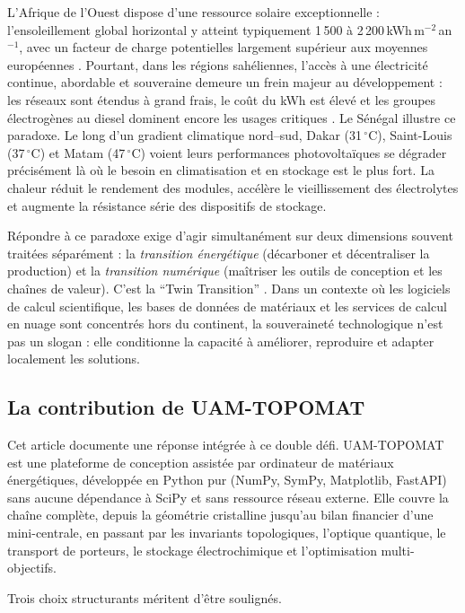 \documentclass[11pt,a4paper,french]{article}
\newcommand{\TOPOMAT}{UAM-TOPOMAT}
\begin{document}
L'Afrique de l'Ouest dispose d'une ressource solaire exceptionnelle : l'ensoleillement global horizontal y atteint typiquement 1\,500 à 2\,200\,kWh\,m$^{-2}$\,an$^{-1}$, avec un facteur de charge potentielles largement supérieur aux moyennes européennes \cite{aie2022,pse2014}. Pourtant, dans les régions sahéliennes, l'accès à une électricité continue, abordable et souveraine demeure un frein majeur au développement : les réseaux sont étendus à grand frais, le coût du kWh est élevé et les groupes électrogènes au diesel dominent encore les usages critiques \cite{banque2022}. Le Sénégal illustre ce paradoxe. Le long d'un gradient climatique nord--sud, Dakar (31\,$^\circ$C), Saint-Louis (37\,$^\circ$C) et Matam (47\,$^\circ$C) voient leurs performances photovoltaïques se dégrader précisément là où le besoin en climatisation et en stockage est le plus fort. La chaleur réduit le rendement des modules, accélère le vieillissement des électrolytes et augmente la résistance série des dispositifs de stockage.

Répondre à ce paradoxe exige d'agir simultanément sur deux dimensions souvent traitées séparément : la \emph{transition énergétique} (décarboner et décentraliser la production) et la \emph{transition numérique} (maîtriser les outils de conception et les chaînes de valeur). C'est la ``Twin Transition'' \cite{ce2020}. Dans un contexte où les logiciels de calcul scientifique, les bases de données de matériaux et les services de calcul en nuage sont concentrés hors du continent, la souveraineté technologique n'est pas un slogan : elle conditionne la capacité à améliorer, reproduire et adapter localement les solutions.

\subsection{La contribution de \TOPOMAT{}}

Cet article documente une réponse intégrée à ce double défi. \TOPOMAT{} est une plateforme de conception assistée par ordinateur de matériaux énergétiques, développée en Python pur (NumPy, SymPy, Matplotlib, FastAPI) sans aucune dépendance à SciPy et sans ressource réseau externe. Elle couvre la chaîne complète, depuis la géométrie cristalline jusqu'au bilan financier d'une mini-centrale, en passant par les invariants topologiques, l'optique quantique, le transport de porteurs, le stockage électrochimique et l'optimisation multi-objectifs.

Trois choix structurants méritent d'être soulignés.
\end{document}
